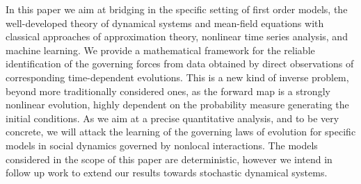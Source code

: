 In this paper we aim at bridging in the specific setting of first order models, the well-developed theory of dynamical systems and mean-field equations with classical  approaches of approximation theory, nonlinear time series analysis, and machine learning. We  provide a  mathematical framework for the reliable identification of the governing forces from data obtained by direct observations of corresponding time-dependent evolutions. This is a new kind of inverse problem, beyond more traditionally considered ones, as the forward map is a strongly nonlinear  evolution, highly dependent on the probability measure generating the initial conditions. As we aim at a precise quantitative analysis, and to be very concrete, we will  attack the learning of the governing laws of evolution for specific models in social dynamics governed by nonlocal interactions. The models considered in the scope of this paper are deterministic, however we intend in follow up work to extend our results towards stochastic dynamical systems.


